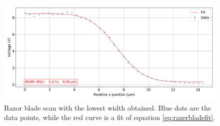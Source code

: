\begin{figure}
\centering
\includegraphics[width=1\textwidth]{img/razorscan}
\caption{Razor blade scan with the lowest width obtained. Blue dots are the data points, while the red curve is a fit of equation \eqref{eq:razerbladefit}.}
\label{examplerazorscan}
\end{figure}


